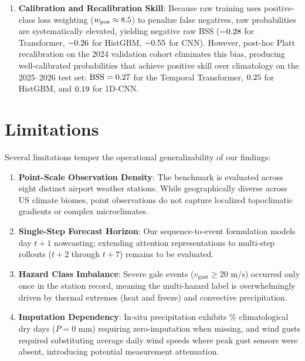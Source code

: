 \documentclass[conference]{IEEEtran}
\begin{document}
\begin{enumerate}
    \item \textbf{Calibration and Recalibration Skill}: Because raw training uses positive-class loss weighting ($w_{\text{pos}} \approx 8.5{}$) to penalize false negatives, raw probabilities are systematically elevated, yielding negative raw BSS ($-0.28{}$ for Transformer, $-0.26{}$ for HistGBM, $-0.55{}$ for CNN). However, post-hoc Platt recalibration on the 2024 validation cohort eliminates this bias, producing well-calibrated probabilities that achieve positive skill over climatology on the 2025--2026 test set: $\text{BSS} = 0.27{}$ for the Temporal Transformer, $0.25{}$ for HistGBM, and $0.19{}$ for 1D-CNN.
\end{enumerate}

\section{Limitations}
\label{sec:limitations}
Several limitations temper the operational generalizability of our findings:
\begin{enumerate}
    \item \textbf{Point-Scale Observation Density}: The benchmark is evaluated across eight distinct airport weather stations. While geographically diverse across US climate biomes, point observations do not capture localized topoclimatic gradients or complex microclimates.
    \item \textbf{Single-Step Forecast Horizon}: Our sequence-to-event formulation models day $t+1$ nowcasting; extending attention representations to multi-step rollouts ($t+2$ through $t+7$) remains to be evaluated.
    \item \textbf{Hazard Class Imbalance}: Severe gale events ($v_{\text{gust}} \ge 20\text{ m/s}$) occurred only once in the station record, meaning the multi-hazard label is overwhelmingly driven by thermal extremes (heat and freeze) and convective precipitation.
    \item \textbf{Imputation Dependency}: In-situ precipitation exhibits \prcpZeroPct{}\% climatological dry days ($P = 0$ mm) requiring zero-imputation when missing, and wind gusts required substituting average daily wind speeds where peak gust sensors were absent, introducing potential measurement attenuation.
\end{enumerate}
\end{document}
